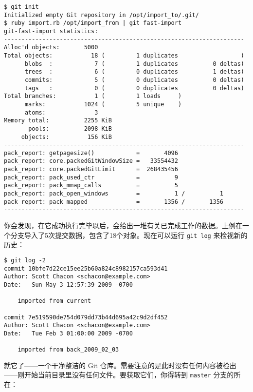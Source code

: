 \documentclass[a4paper]{book}
\begin{document}
\begin{shaded}\begin{verbatim}
$ git init
Initialized empty Git repository in /opt/import_to/.git/
$ ruby import.rb /opt/import_from | git fast-import
git-fast-import statistics:
---------------------------------------------------------------------
Alloc'd objects:       5000
Total objects:           18 (         1 duplicates                  )
      blobs  :            7 (         1 duplicates          0 deltas)
      trees  :            6 (         0 duplicates          1 deltas)
      commits:            5 (         0 duplicates          0 deltas)
      tags   :            0 (         0 duplicates          0 deltas)
Total branches:           1 (         1 loads     )
      marks:           1024 (         5 unique    )
      atoms:              3
Memory total:          2255 KiB
       pools:          2098 KiB
     objects:           156 KiB
---------------------------------------------------------------------
pack_report: getpagesize()            =       4096
pack_report: core.packedGitWindowSize =   33554432
pack_report: core.packedGitLimit      =  268435456
pack_report: pack_used_ctr            =          9
pack_report: pack_mmap_calls          =          5
pack_report: pack_open_windows        =          1 /          1
pack_report: pack_mapped              =       1356 /       1356
---------------------------------------------------------------------
\end{verbatim}\end{shaded}

你会发现，在它成功执行完毕以后，会给出一堆有关已完成工作的数据。上例在一个分支导入了5次提交数据，包含了18个对象。现在可以运行 \texttt{git log} 来检视新的历史：

\begin{shaded}\begin{verbatim}
$ git log -2
commit 10bfe7d22ce15ee25b60a824c8982157ca593d41
Author: Scott Chacon <schacon@example.com>
Date:   Sun May 3 12:57:39 2009 -0700

    imported from current

commit 7e519590de754d079dd73b44d695a42c9d2df452
Author: Scott Chacon <schacon@example.com>
Date:   Tue Feb 3 01:00:00 2009 -0700

    imported from back_2009_02_03
\end{verbatim}\end{shaded}

就它了------一个干净整洁的 Git 仓库。需要注意的是此时没有任何内容被检出------刚开始当前目录里没有任何文件。要获取它们，你得转到 \texttt{master} 分支的所在：
\end{document}
